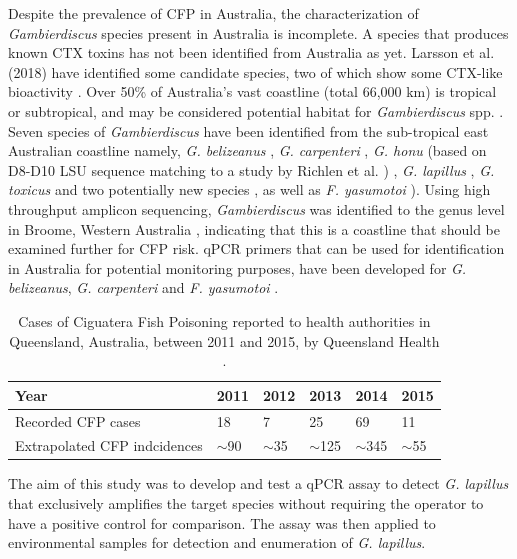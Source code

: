 \documentclass[10pt,letterpaper]{article}
\begin{document}
Despite the prevalence of CFP in Australia, the characterization of \textit{Gambierdiscus} species present in Australia is incomplete. 
A species that produces known CTX toxins has not been identified from Australia as yet. 
Larsson et al. (2018) have identified some candidate species, two of which show some CTX-like bioactivity \cite{larsson2018toxicology}.
Over 50\% of Australia's vast coastline (total 66,000 km) is tropical or subtropical, and may be considered potential habitat for \emph{Gambierdiscus} spp. \citep{kretzschmar2017characterization}. 
Seven species of \emph{Gambierdiscus} have been identified from the sub-tropical east Australian coastline namely, \emph{G. belizeanus} \citep{murray2014molecular}, \emph{G. carpenteri} \citep{kohli2014high,sparrow2017effects}, \emph{G. honu} (based on D8-D10 LSU sequence matching to a study by Richlen et al. \cite{richlen2008phylogeography}) \citep{rhodes2017new}, \emph{G. lapillus} \citep{kretzschmar2017characterization,larsson2018toxicology}, \emph{G. toxicus} \citep{hallegraeff2010algae} and two potentially new species \cite{larsson2018toxicology}, as well as \emph{F. yasumotoi}  \citep{murray2014molecular}). 
Using high throughput amplicon sequencing, \textit{Gambierdiscus} was identified to the genus level in Broome, Western Australia \citep{kohli2014cob}, indicating that this is a coastline that should be examined further for CFP risk. 
qPCR primers that can be used for identification in Australia for potential monitoring purposes, have been developed for \emph{G. belizeanus}, \emph{G. carpenteri} and \emph{F. yasumotoi} \citep{nishimura2016quantitative,vandersea2012development}. 
 
\begin{table}
\caption{Cases of Ciguatera Fish Poisoning reported to health authorities in Queensland, Australia, between 2011 and 2015, by Queensland Health \citep{qldcig}.}
\label{tbl:CFPTable}
\begin{tabular}{ | p{6cm} | p{1.5cm} | p{1.5cm}| p{1.5cm} | p{1.5cm} | p{1.5cm} | }
\hline
Year &2011&2012&2013&2014&2015\\
\hline
Recorded CFP cases&18&7&25&69&11\\
\hline
Extrapolated CFP indcidences&$\sim$90&$\sim$35&$\sim$125&$\sim$345&$\sim$55\\
\hline
\end{tabular}
\end{table}
\FloatBarrier

The aim of this study was to develop and test a qPCR assay to detect \emph{G. lapillus} that exclusively amplifies the target species without requiring the operator to have a positive control for comparison. 
The assay was then applied to environmental samples for detection and enumeration of \textit{G. lapillus}.
\end{document}
